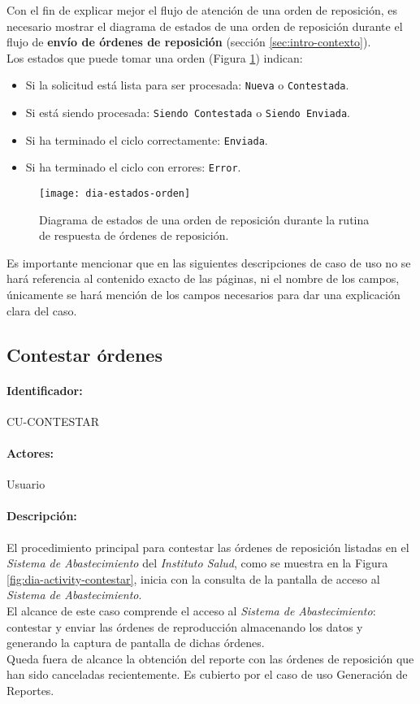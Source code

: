 Con el fin de explicar mejor el flujo de atención de una orden de reposición, es necesario mostrar el diagrama de estados de una orden de reposición durante el flujo de \textbf{envío de órdenes de reposición} (sección \ref{sec:intro-contexto}).\\
Los estados que puede tomar una orden (Figura \ref{fig:dia-estados-orden}) indican:
\begin{itemize}
  \item Si la solicitud está lista para ser procesada: \texttt{Nueva} o \texttt{Contestada}.
  \item Si está siendo procesada: \texttt{Siendo Contestada} o \texttt{Siendo Enviada}.
  \item Si ha terminado el ciclo correctamente: \texttt{Enviada}.
  \item Si ha terminado el ciclo con errores: \texttt{Error}.
\end{itemize} 

\begin{figure}[h]
  \centering
  \texttt{[image: dia-estados-orden]} 
  \caption{Diagrama de estados de una orden de reposición durante la rutina de respuesta de órdenes de reposición.}
  \label{fig:dia-estados-orden}
\end{figure}

Es importante mencionar que en las siguientes descripciones de caso de uso no se hará referencia al contenido exacto de las páginas, ni el nombre de los campos, únicamente se hará mención de los campos necesarios para dar una explicación clara del caso.

\subsection{Contestar órdenes}\label{cu-contestar}
\paragraph{Identificador:}
CU-CONTESTAR
\paragraph{Actores:}
Usuario
\paragraph{Descripción:}
El procedimiento principal para contestar las órdenes de reposición listadas en el \textit{Sistema de Abastecimiento} del \textit{Instituto Salud}, como se muestra en la Figura \ref{fig:dia-activity-contestar}, inicia con la consulta de la pantalla de acceso al \textit{Sistema de Abastecimiento}.\\
El alcance de este caso comprende el acceso al \textit{Sistema de Abastecimiento}: contestar y enviar las órdenes de reproducción almacenando los datos y generando la captura de pantalla de dichas órdenes.\\
Queda fuera de alcance la obtención del reporte con las órdenes de reposición que han sido canceladas recientemente. Es cubierto por el caso de uso Generación de Reportes.

